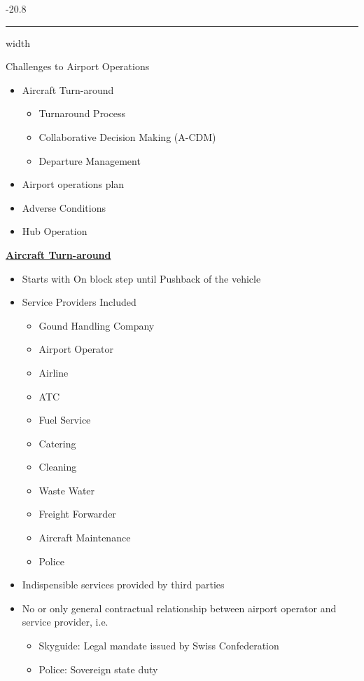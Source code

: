 \documentclass[9pt, landscape, fleqn]{scrartcl}
\makeatletter
\renewcommand{\subsubsection}{\@startsection{subsubsection}{1}{0mm}%
{-2\baselineskip}{0.8\baselineskip}%
{\hrule depth 0.2pt width\columnwidth\vspace*{1.2em}\normalsize\bfseries\rmfamily}}
\makeatother
\begin{document}
\begin{multicols*}{3}
\subsubsection{Challenges to Airport Operations}
\begin{itemize}
    \item Aircraft Turn-around 
    \begin{itemize}
        \item Turnaround Process 
        \item Collaborative Decision Making (A-CDM)
        \item Departure Management 
    \end{itemize}
    \item Airport operations plan 
    \item Adverse Conditions 
    \item Hub Operation 
\end{itemize}
\underline{\textbf{Aircraft Turn-around}}
\begin{itemize}
    \item Starts with On block step until Pushback of the vehicle 
    \item Service Providers Included 
    \begin{itemize}
        \item Gound Handling Company 
        \item Airport Operator 
        \item Airline 
        \item ATC 
        \item Fuel Service 
        \item Catering 
        \item Cleaning 
        \item Waste Water 
        \item Freight Forwarder 
        \item Aircraft Maintenance 
        \item Police 
    \end{itemize}
    \item Indispensible services provided by third parties 
    \item No or only general contractual relationship between airport operator and service provider, i.e.
    \begin{itemize}
        \item Skyguide: Legal mandate issued by Swiss Confederation
        \item Police: Sovereign state duty 

\end{itemize}
\end{itemize}
\end{multicols*}
\end{document}
